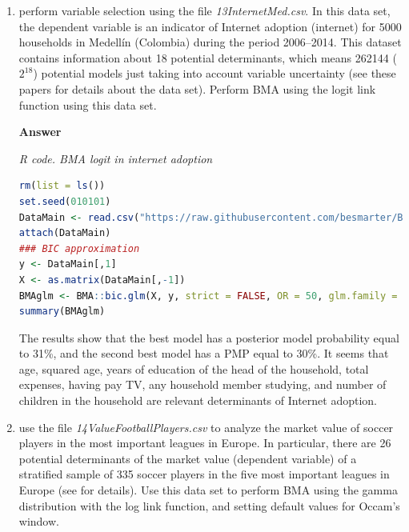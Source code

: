 \begin{enumerate}[leftmargin=*]
then $\eta(\theta)=\log\left(\frac{\theta}{1-\theta}\right)$, and this density in the canonical form is $p(y|\eta)=\exp\left\{ y\eta-\log(1+\exp(\eta))\right\}$  consequently, $\mathbb{E}[Y|\bm{x}]=\nabla\left(\log(1+\exp(\eta))\right)=\frac{\exp(\eta)}{1+\exp(\eta)}=\theta=\frac{\exp(\bm{x}^{\top}\bm{\beta})}{1+\exp(\bm{x}^{\top}\bm{\beta})}$. Then, the link function in the Bernoulli case is the \textit{logit} function.

\item \cite{ramirez2020dynamic,ramirez2021specification} perform variable selection using the file \textit{13InternetMed.csv}. In this data set, the dependent variable is an indicator of Internet adoption (internet) for 5000 households in Medell\'in (Colombia) during the period 2006--2014. This dataset contains information about 18 potential determinants, which means 262144 ($2^{18}$) potential models just taking into account variable uncertainty (see these papers for details about the data set). Perform BMA using the logit link function using this data set. 

\textbf{Answer}


\begin{tcolorbox}[enhanced,width=4.67in,center upper,
	fontupper=\large\bfseries,drop shadow southwest,sharp corners]
	\textit{R code. BMA logit in internet adoption}
	\begin{VF}
		\begin{lstlisting}[language=R]
rm(list = ls())
set.seed(010101)
DataMain <- read.csv("https://raw.githubusercontent.com/besmarter/BSTApp/refs/heads/master/DataApp/13InternetMed.csv", sep = ",", header = TRUE, quote = "")
attach(DataMain)
### BIC approximation
y <- DataMain[,1]
X <- as.matrix(DataMain[,-1])
BMAglm <- BMA::bic.glm(X, y, strict = FALSE, OR = 50, glm.family = binomial(link="logit"))
summary(BMAglm)
		\end{lstlisting}
	\end{VF}
\end{tcolorbox}

The results show that the best model has a posterior model probability equal to 31\%, and the second best model has a PMP equal to 30\%. It seems that age, squared age, years of education of the head of the household, total expenses, having pay TV, any household member studying, and number of children in the household are relevant determinants of Internet adoption. 


\item \cite{Serna2018} use the file \textit{14ValueFootballPlayers.csv} to analyze the market value of soccer players in the most important leagues in Europe. In particular, there are 26 potential determinants of the market value (dependent variable) of a stratified sample of 335 soccer players in the five most important leagues in Europe (see \cite{Serna2018} for details). Use this data set to perform BMA using the gamma distribution with the log link function, and setting default values for Occam's window.


\end{enumerate}
